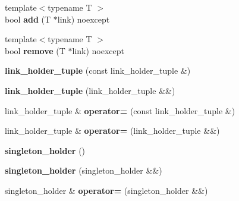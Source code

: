 \begin{CompactItemize}
\item 
\hypertarget{classhope_1_1final_6c07e673a719b0199b453793474e1541}{
{\footnotesize template$<$typename T $>$ }\\bool \textbf{add} (T $\ast$link) noexcept}
\label{classhope_1_1final_6c07e673a719b0199b453793474e1541}

\item 
\hypertarget{classhope_1_1final_cf1c04b8b370dc700f287be4d307ab2b}{
{\footnotesize template$<$typename T $>$ }\\bool \textbf{remove} (T $\ast$link) noexcept}
\label{classhope_1_1final_cf1c04b8b370dc700f287be4d307ab2b}

\item 
\hypertarget{classhope_1_1final_84ea3e2852e3692b63a95b78c197ab7f}{
\textbf{link\_\-holder\_\-tuple} (const link\_\-holder\_\-tuple \&)}
\label{classhope_1_1final_84ea3e2852e3692b63a95b78c197ab7f}

\item 
\hypertarget{classhope_1_1final_2c54b8c9263dee663cb0a51ea30cb4f3}{
\textbf{link\_\-holder\_\-tuple} (link\_\-holder\_\-tuple \&\&)}
\label{classhope_1_1final_2c54b8c9263dee663cb0a51ea30cb4f3}

\item 
\hypertarget{classhope_1_1final_c1176c101f3185f84a652638ab9c82b7}{
link\_\-holder\_\-tuple \& \textbf{operator=} (const link\_\-holder\_\-tuple \&)}
\label{classhope_1_1final_c1176c101f3185f84a652638ab9c82b7}

\item 
\hypertarget{classhope_1_1final_5229cb5247ce9273934f88136863683f}{
link\_\-holder\_\-tuple \& \textbf{operator=} (link\_\-holder\_\-tuple \&\&)}
\label{classhope_1_1final_5229cb5247ce9273934f88136863683f}

\item 
\hypertarget{classhope_1_1final_4e993ebfa25c6ab2bc6d5cb28f711512}{
\textbf{singleton\_\-holder} ()}
\label{classhope_1_1final_4e993ebfa25c6ab2bc6d5cb28f711512}

\item 
\hypertarget{classhope_1_1final_af516db9bbd8b80534adec0aa9bf8d65}{
\textbf{singleton\_\-holder} (singleton\_\-holder \&\&)}
\label{classhope_1_1final_af516db9bbd8b80534adec0aa9bf8d65}

\item 
\hypertarget{classhope_1_1final_3ad67d8e2a660cde191dda2952ace147}{
singleton\_\-holder \& \textbf{operator=} (singleton\_\-holder \&\&)}
\label{classhope_1_1final_3ad67d8e2a660cde191dda2952ace147}


\end{CompactItemize}
